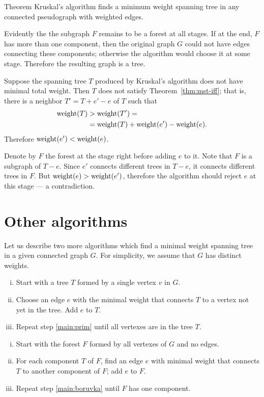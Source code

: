 \begin{thm}{Theorem}\label{thm:kruskal}
Kruskal’s algorithm finds a minimum weight spanning tree in any connected pseudograph with weighted edges.
\end{thm}

Evidently the the subgraph $F$ remains to be a forest at all stages.
If at the end, $F$ has more than one component, then the original graph $G$ could not have edges connecting these components;
otherwise the algorithm would choose it at some stage.
Therefore the resulting graph is a tree.

Suppose the spanning tree $T$ produced by Kruskal’s algorithm does not have minimal total weight.
Then $T$ does not satisfy Theorem~\ref{thm:mst-iff};
that is, there is a neighbor $T'=T+e'-e$ of $T$ such that 
\begin{align*}
\mathop{\rm weight}\nolimits(T)&>\mathop{\rm weight}\nolimits(T')=
\\
&=\mathop{\rm weight}\nolimits(T)+\mathop{\rm weight}\nolimits(e')-\mathop{\rm weight}\nolimits(e).
\end{align*}
Therefore $\mathop{\rm weight}\nolimits(e')<\mathop{\rm weight}\nolimits(e)$.

Denote by $F$ the forest at the stage right before adding $e$ to it.
Note that $F$ is a subgraph of $T-e$.
Since $e'$ connects different trees in $T-e$,
it connects different trees in $F$.
But $\mathop{\rm weight}\nolimits(e)>\mathop{\rm weight}\nolimits(e')$, therefore the algorithm should reject $e$ at this stage --- a contradiction.
\qeds

\section*{Other algorithms}

Let us describe two more algorithms which find  a minimal weight spanning tree in a given connected graph $G$.
For simplicity, we assume that $G$ has distinct weights.

\begin{enumerate}[(i)]
\item Start with a tree $T$ formed by a single vertex $v$ in $G$.
\item\label{main:prim} Choose an edge $e$ with the minimal weight that connects $T$ to a vertex not yet in the tree.
Add $e$ to $T$.
\item Repeat step \ref{main:prim} until all vertexes are in the tree $T$.
\end{enumerate}

\begin{enumerate}[(i)]
\item Start with the forest $F$ formed by all vertexes of $G$ and no edges.
\item\label{main:boruvka} For each component $T$ of $F$, find an edge $e$ with minimal weight that connects $T$ to another component of $F$; add $e$ to $F$.
\item Repeat step \ref{main:boruvka} until $F$ has one component. 
\end{enumerate}


